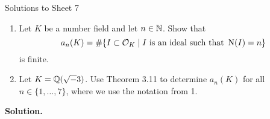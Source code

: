 \documentclass[a4paper,11pt]{article}
\begin{document}
\begin{center}
    \huge{Solutions to Sheet 7}
\end{center}

\begin{enumerate}
    \item Let $K$ be a number field and let $n \in \mathbb{N}$. Show that 
        \begin{equation*}
            a_n(K) = \# \{I \subset \mathcal{O}_K \mid I \text{ is an ideal such 
            that } \operatorname{N}(I) = n\}
        \end{equation*}
        is finite.
    \item Let $K = \mathbb{Q}(\sqrt -3)$. Use Theorem 3.11 to determine $a_n(K)$ for all
        $n \in \{1, \dots, 7\}$, where we use the notation from 1.
\end{enumerate}
\textbf{Solution.}
\end{document}
